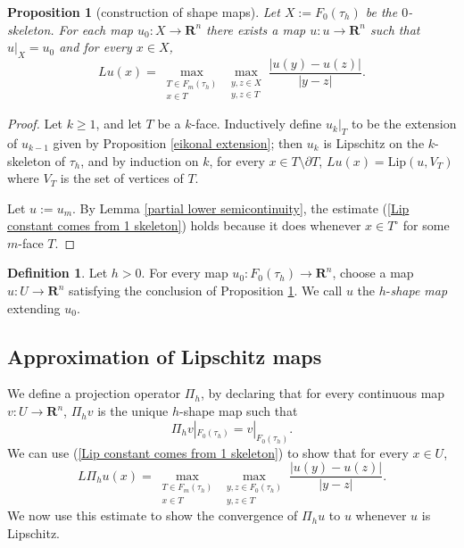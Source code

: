 \documentclass[reqno,11pt]{amsart}
\newcommand{\RR}{\mathbf{R}}
\newcommand{\Lip}{\mathrm{Lip}}
\newcommand{\dfn}[1]{\emph{#1}\index{#1}}
\newtheorem{proposition}[theorem]{Proposition}
\theoremstyle{definition}
\newtheorem{definition}[theorem]{Definition}
\numberwithin{equation}{section}
\begin{document}
\begin{proposition}[construction of shape maps]\label{construction of shape maps}
Let $X := F_0(\tau_h)$ be the $0$-skeleton.
For each map $u_0: X \to \RR^n$ there exists a map $u: u \to \RR^n$ such that $u|_X = u_0$ and for every $x \in X$,
\begin{equation}\label{Lip constant comes from 1 skeleton}
Lu(x) = \max_{\substack{T \in F_m(\tau_h) \\ x \in T}} \max_{\substack{y, z \in X \\ y, z \in T}} \frac{|u(y) - u(z)|}{|y - z|}.
\end{equation}
\end{proposition}
\begin{proof}
Let $k \geq 1$, and let $T$ be a $k$-face.
Inductively define $u_k|_T$ to be the extension of $u_{k - 1}$ given by Proposition \ref{eikonal extension}; then $u_k$ is Lipschitz on the $k$-skeleton of $\tau_h$, and by induction on $k$, for every $x \in T \setminus \partial T$, $Lu(x) = \Lip(u, V_T)$ where $V_T$ is the set of vertices of $T$.

Let $u := u_m$.
By Lemma \ref{partial lower semicontinuity}, the estimate (\ref{Lip constant comes from 1 skeleton}) holds because it does whenever $x \in T^\circ$ for some $m$-face $T$.
\end{proof}

\begin{definition}
Let $h > 0$.
For every map $u_0: F_0(\tau_h) \to \RR^n$, choose a map $u: U \to \RR^n$ satisfying the conclusion of Proposition \ref{construction of shape maps}.
We call $u$ the $h$-\dfn{shape map} extending $u_0$.
\end{definition}

\subsection{Approximation of Lipschitz maps}
We define a projection operator $\Pi_h$, by declaring that for every continuous map $v: U \to \RR^n$, $\Pi_h v$ is the unique $h$-shape map such that 
$$\Pi_h v|_{F_0(\tau_h)} = v|_{F_0(\tau_h)}.$$
We can use (\ref{Lip constant comes from 1 skeleton}) to show that for every $x \in U$,
\begin{equation}\label{discrete derivative is vertex lip}
L \Pi_h u(x) = \max_{\substack{T \in F_m(\tau_h) \\ x \in T}} \max_{\substack{y, z \in F_0(\tau_h) \\ y, z \in T}} \frac{|u(y) - u(z)|}{|y - z|}.
\end{equation}
We now use this estimate to show the convergence of $\Pi_h u$ to $u$ whenever $u$ is Lipschitz.
\end{document}
